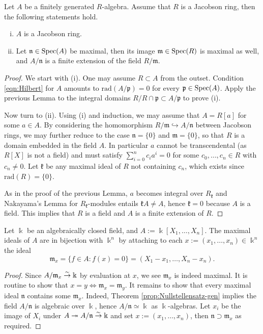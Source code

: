 \begin{theorem}[Nullstellensatz]\label{prop:Nullstellensatz-gen}
	Let $A$ be a finitely generated $R$-algebra. Assume that $R$ is a Jacobson ring, then the following statements hold.
	\begin{enumerate}[(i)]
		\item $A$ is a Jacobson ring.
		\item Let $\mathfrak{n} \in \operatorname{Spec}(A)$ be maximal, then its image $\mathfrak{m} \in \operatorname{Spec}(R)$ is maximal as well, and $A/\mathfrak{n}$ is a finite extension of the field $R/\mathfrak{m}$.
	\end{enumerate}
\end{theorem}
\begin{proof}
	We start with (i). One may assume $R \subset A$ from the outset. Condition \eqref{eqn:Hilbert} for $A$ amounts to $\text{rad}(A/\mathfrak{p})=0$ for every $\mathfrak{p} \in \operatorname{Spec}(A)$. Apply the previous Lemma to the integral domains $R/R \cap \mathfrak{p} \subset A/\mathfrak{p}$ to prove (i).
	
	Now turn to (ii). Using (i) and induction, we may assume that $A=R[a]$ for some $a \in A$. By considering the homomorphism $R/\mathfrak{m} \hookrightarrow A/\mathfrak{n}$ between Jacobson rings, we may further reduce to the case $\mathfrak{n}=\{0\}$ and $\mathfrak{m}=\{0\}$, so that $R$ is a domain embedded in the field $A$. In particular $a$ cannot be transcendental (as $R[X]$ is not a field) and must satisfy $\sum_{i=0}^n c_i a^i = 0$ for some $c_0, \ldots, c_n \in R$ with $c_n \neq 0$. Let $\mathfrak{k}$ be any maximal ideal of $R$ not containing $c_n$, which exists since $\text{rad}(R) = \{0\}$.
	
	As in the proof of the previous Lemma, $a$ becomes integral over $R_{\mathfrak{k}}$ and Nakayama's Lemma for $R_{\mathfrak{k}}$-modules entails $\mathfrak{k}A \neq A$, hence $\mathfrak{k}=0$ because $A$ is a field. This implies that $R$ is a field and $A$ is a finite extension of $R$.
\end{proof}

\begin{corollary}
	Let $\Bbbk$ be an algebraically closed field, and $A := \Bbbk[X_1, \ldots, X_n]$. The maximal ideals of $A$ are in bijection with $\Bbbk^n$ by attaching to each $x := (x_1, \ldots, x_n) \in \Bbbk^n$ the ideal
	\[ \mathfrak{m}_x = \{f \in A : f(x)=0 \} = (X_1 - x_1, \ldots, X_n - x_n). \]
\end{corollary}
\begin{proof}
	Since $A/\mathfrak{m}_x \stackrel{\sim}{\rightarrow} \Bbbk$ by evaluation at $x$, we see $\mathfrak{m}_x$ is indeed maximal. It is routine to show that $x = y \iff \mathfrak{m}_x = \mathfrak{m}_y$. It remains to show that every maximal ideal $\mathfrak{n}$ contains some $\mathfrak{m}_x$. Indeed, Theorem \ref{prop:Nullstellensatz-gen} implies the field $A/\mathfrak{n}$ is algebraic over $\Bbbk$, hence $A/\mathfrak{n} \simeq \Bbbk$ as $\Bbbk$-algebras. Let $x_i$ be the image of $X_i$ under $A \twoheadrightarrow A/\mathfrak{n} \stackrel{\sim}{\rightarrow} \Bbbk$ and set $x := (x_1, \ldots, x_n)$, then $\mathfrak{n} \supset \mathfrak{m}_x$ as required.
\end{proof}

